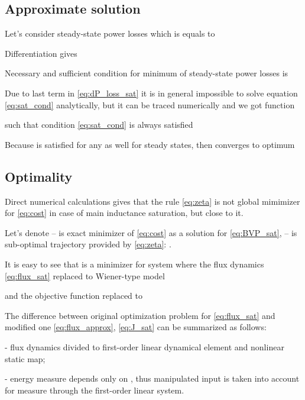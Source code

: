 \documentclass[journal]{IEEEtran}
\begin{document}
\subsection{Approximate solution}

Let's consider steady-state power losses which is equals to  



Differentiation gives



Necessary and sufficient condition for minimum of steady-state power losses is 



Due to last term in \eqref{eq:dP_loss_sat} it is in general impossible to solve equation \eqref{eq:sat_cond} analytically, but it can be traced numerically and we got function



such that condition \eqref{eq:sat_cond} is always satisfied



Because  is satisfied for any  as well for steady states, then  converges to optimum



\subsection{Optimality}

Direct numerical calculations gives that the rule \eqref{eq:zeta} is not global mimimizer for \eqref{eq:cost} in case of main inductance saturation, but close to it. 

Let's denote  -- is exact minimizer of \eqref{eq:cost} as a solution for \eqref{eq:BVP_sat},  -- is sub-optimal trajectory provided by \eqref{eq:zeta}: .

It is easy to see that  is a minimizer for system where the flux dynamics \eqref{eq:flux_sat} replaced to Wiener-type model



and the objective function replaced to 



The difference between original optimization problem for \eqref{eq:flux_sat} and modified one \eqref{eq:flux_approx}, \eqref{eq:J_sat} can be summarized as follows:

- flux dynamics divided to first-order linear dynamical element and nonlinear static map;

- energy measure  depends only on , thus manipulated input  is taken into account for measure through the first-order linear system.
\end{document}
